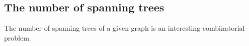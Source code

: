 \subsection{The number of spanning trees}
The number of spanning trees of a given graph is an interesting combinatorial problem.
